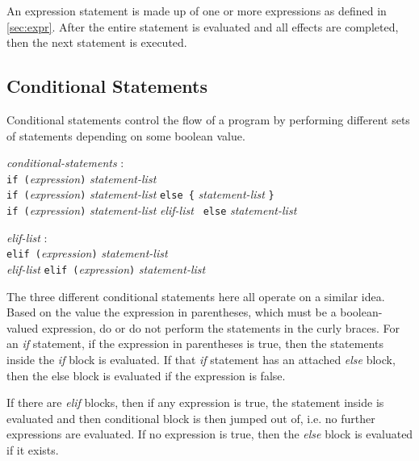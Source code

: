 \documentclass{article}
\begin{document}
An expression statement is made up of one or more expressions as defined in \ref{sec:expr}. After the entire statement is evaluated and all effects are completed, then the next statement is executed.

\subsection{Conditional Statements}
Conditional statements control the flow of a program by performing different sets of statements depending on some boolean value. 

\begin{tabbing}
	\= \emph{cond}\=\emph{itional-statements} : \\
		\> \> \texttt{if (}\emph{expression}\texttt{)} \emph{statement-list}\\
		\>\>  \texttt{if (}\emph{expression}\texttt{)} \emph{statement-list} \texttt{} \texttt{else}\texttt{ \{} \emph{statement-list} \texttt{\}} \\
		\>\>  \texttt{if (}\emph{expression}\texttt{)} \emph{statement-list} \texttt{} \emph{elif-list} \texttt{ else} \emph{statement-list} \\
\end{tabbing}
\begin{tabbing}
	\= \emph{eli}\=\emph{f-list} : \\
		\> \> \texttt{elif (}\emph{expression}\texttt{)} \emph{statement-list} \\
		\> \> \emph{elif-list} \texttt{elif (}\emph{expression}\texttt{)} \emph{statement-list}\\
\end{tabbing}



The three different conditional statements here all operate on a similar idea. Based on the value the expression in parentheses, which must be a boolean-valued expression, do or do not perform the statements in the curly braces. For an \emph{if} statement, if the expression in parentheses is true, then the statements inside the \emph{if} block is evaluated. If that \emph{if} statement has an attached \emph{else} block, then the else block is evaluated if the expression is false. 

If there are \emph{elif} blocks, then if any expression is true, the statement inside is evaluated and then conditional block is then jumped out of, i.e. no further expressions are evaluated. If no expression is true, then the \emph{else} block is evaluated if it exists.
\end{document}
